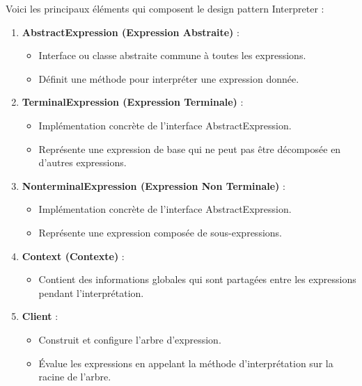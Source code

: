 \documentclass[french]{article}
\begin{document}
Voici les principaux éléments qui composent le design pattern Interpreter :

\begin{enumerate}
    \item \textbf{AbstractExpression (Expression Abstraite)} :
    \begin{itemize}
        \item Interface ou classe abstraite commune à toutes les expressions.
        \item Définit une méthode pour interpréter une expression donnée.
    \end{itemize}
    
    \item \textbf{TerminalExpression (Expression Terminale)} :
    \begin{itemize}
        \item Implémentation concrète de l'interface AbstractExpression.
        \item Représente une expression de base qui ne peut pas être décomposée en d'autres expressions.
    \end{itemize}
    
    \item \textbf{NonterminalExpression (Expression Non Terminale)} :
    \begin{itemize}
        \item Implémentation concrète de l'interface AbstractExpression.
        \item Représente une expression composée de sous-expressions.
    \end{itemize}
    
    \item \textbf{Context (Contexte)} :
    \begin{itemize}
        \item Contient des informations globales qui sont partagées entre les expressions pendant l'interprétation.
    \end{itemize}
    
    \item \textbf{Client} :
    \begin{itemize}
        \item Construit et configure l'arbre d'expression.
        \item Évalue les expressions en appelant la méthode d'interprétation sur la racine de l'arbre.
    \end{itemize}
\end{enumerate}
\end{document}
